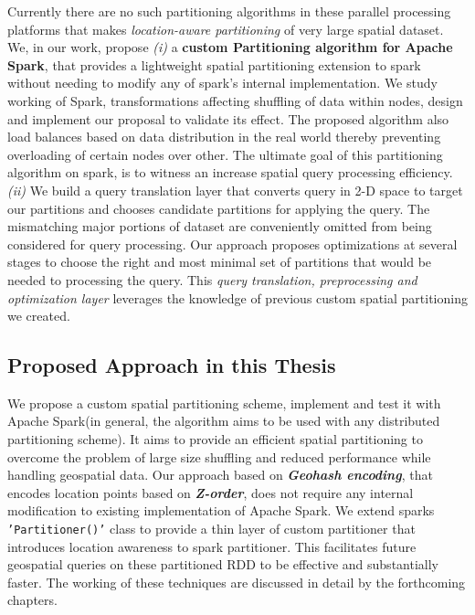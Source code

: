 \documentclass[article,type=msc,colorback,12pt,accentcolor=tud1d]{tudthesis}
\begin{document}
		Currently there are no such partitioning algorithms in these parallel processing platforms that makes \textit{location-aware partitioning} of very large spatial dataset. We, in our work,  propose \textit{(i)} a \textbf{custom Partitioning algorithm for Apache Spark}, that provides a lightweight spatial partitioning extension to spark without needing to modify any of spark's internal implementation. We study working of Spark, transformations affecting shuffling of data within nodes, design and implement our proposal to validate its effect. The proposed algorithm also load balances based on data distribution in the real world thereby preventing overloading of certain nodes over other. The ultimate goal of this partitioning algorithm on spark, is to witness an increase spatial query processing efficiency. \textit{(ii)} We build a query translation layer that converts query in 2-D space to target our partitions and chooses candidate partitions for applying the query. The mismatching major portions of dataset are conveniently omitted from being considered for query processing. Our approach proposes optimizations at several stages to choose the right and most minimal set of partitions that would be needed to processing the query. This \textit{query translation, preprocessing and optimization layer} leverages the knowledge of previous custom spatial partitioning we created.  
		
		\clearpage
		\subsection{Proposed Approach in this Thesis}
		\par We propose a custom spatial partitioning scheme, implement and test it with Apache Spark(in general, the algorithm aims to be used with any distributed partitioning scheme). It aims to provide an efficient spatial partitioning to overcome the problem of large size shuffling and reduced performance while handling geospatial data. Our approach based on \textbf{\textit{Geohash encoding}}, that encodes location points based on \textbf{\textit{Z-order}}, does not require any internal modification to existing implementation of Apache Spark. We extend sparks \texttt{'Partitioner()'} class to provide a thin layer of custom partitioner that introduces location awareness to spark partitioner. This facilitates future geospatial queries on these partitioned RDD to be effective and substantially faster. The working of these techniques are discussed in detail by the forthcoming chapters.
		
\end{document}
